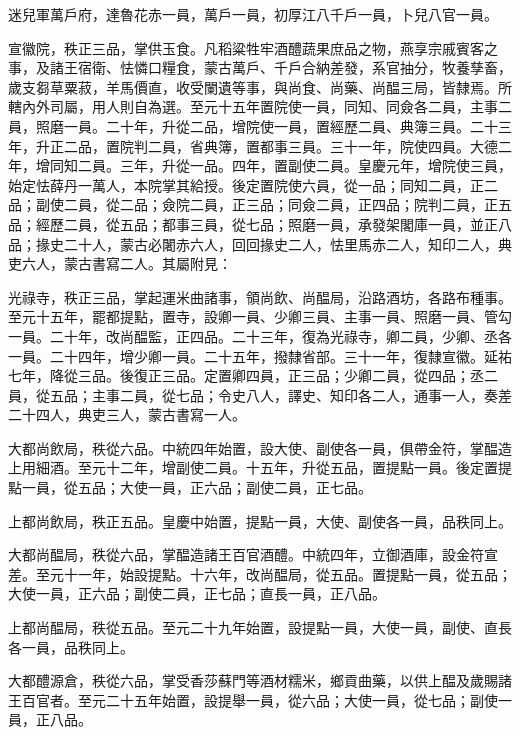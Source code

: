 \begin{pinyinscope}
 迷兒軍萬戶府，達魯花赤一員，萬戶一員，初厚江八千戶一員，卜兒八官一員。



 宣徽院，秩正三品，掌供玉食。凡稻粱牲牢酒醴蔬果庶品之物，燕享宗戚賓客之事，及諸王宿衛、怯憐口糧食，蒙古萬戶、千戶合納差發，系官抽分，牧養孳畜，歲支芻草粟菽，羊馬價直，收受闌遺等事，與尚食、尚藥、尚醖三局，皆隸焉。所轄內外司屬，用人則自為選。至元十五年置院使一員，同知、同僉各二員，主事二員，照磨一員。二十年，升從二品，增院使一員，置經歷二員、典簿三員。二十三年，升正二品，置院判二員，省典簿，置都事三員。三十一年，院使四員。大德二年，增同知二員。三年，升從一品。四年，置副使二員。皇慶元年，增院使三員，始定怯薛丹一萬人，本院掌其給授。後定置院使六員，從一品；同知二員，正二品；副使二員，從二品；僉院二員，正三品；同僉二員，正四品；院判二員，正五品；經歷二員，從五品；都事三員，從七品；照磨一員，承發架閣庫一員，並正八品；掾史二十人，蒙古必闍赤六人，回回掾史二人，怯里馬赤二人，知印二人，典吏六人，蒙古書寫二人。其屬附見：



 光祿寺，秩正三品，掌起運米曲諸事，領尚飲、尚醖局，沿路酒坊，各路布種事。至元十五年，罷都提點，置寺，設卿一員、少卿三員、主事一員、照磨一員、管勾一員。二十年，改尚醖監，正四品。二十三年，復為光祿寺，卿二員，少卿、丞各一員。二十四年，增少卿一員。二十五年，撥隸省部。三十一年，復隸宣徽。延祐七年，降從三品。後復正三品。定置卿四員，正三品；少卿二員，從四品；丞二員，從五品；主事二員，從七品；令史八人，譯史、知印各二人，通事一人，奏差二十四人，典吏三人，蒙古書寫一人。



 大都尚飲局，秩從六品。中統四年始置，設大使、副使各一員，俱帶金符，掌醖造上用細酒。至元十二年，增副使二員。十五年，升從五品，置提點一員。後定置提點一員，從五品；大使一員，正六品；副使二員，正七品。



 上都尚飲局，秩正五品。皇慶中始置，提點一員，大使、副使各一員，品秩同上。



 大都尚醖局，秩從六品，掌醖造諸王百官酒醴。中統四年，立御酒庫，設金符宣差。至元十一年，始設提點。十六年，改尚醖局，從五品。置提點一員，從五品；大使一員，正六品；副使二員，正七品；直長一員，正八品。



 上都尚醖局，秩從五品。至元二十九年始置，設提點一員，大使一員，副使、直長各一員，品秩同上。



 大都醴源倉，秩從六品，掌受香莎蘇門等酒材糯米，鄉貢曲藥，以供上醖及歲賜諸王百官者。至元二十五年始置，設提舉一員，從六品；大使一員，從七品；副使一員，正八品。




\end{pinyinscope}
